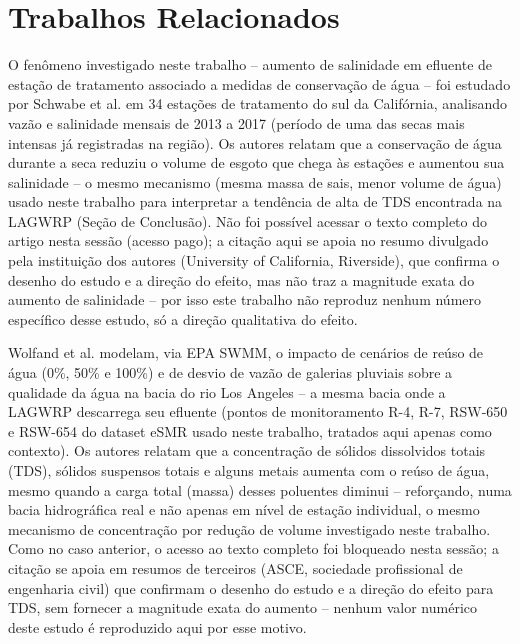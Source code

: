 \section{Trabalhos Relacionados}

O fenômeno investigado neste trabalho -- aumento de salinidade em efluente de estação de tratamento associado a medidas de conservação de água -- foi estudado por Schwabe et al. \cite{schwabe2020unintended} em 34 estações de tratamento do sul da Califórnia, analisando vazão e salinidade mensais de 2013 a 2017 (período de uma das secas mais intensas já registradas na região). Os autores relatam que a conservação de água durante a seca reduziu o volume de esgoto que chega às estações e aumentou sua salinidade -- o mesmo mecanismo (mesma massa de sais, menor volume de água) usado neste trabalho para interpretar a tendência de alta de TDS encontrada na LAGWRP (Seção de Conclusão). Não foi possível acessar o texto completo do artigo nesta sessão (acesso pago); a citação aqui se apoia no resumo divulgado pela instituição dos autores (University of California, Riverside), que confirma o desenho do estudo e a direção do efeito, mas não traz a magnitude exata do aumento de salinidade -- por isso este trabalho não reproduz nenhum número específico desse estudo, só a direção qualitativa do efeito.

Wolfand et al. \cite{wolfand2022dilution} modelam, via EPA SWMM, o impacto de cenários de reúso de água (0\%, 50\% e 100\%) e de desvio de vazão de galerias pluviais sobre a qualidade da água na bacia do rio Los Angeles -- a mesma bacia onde a LAGWRP descarrega seu efluente (pontos de monitoramento R-4, R-7, RSW-650 e RSW-654 do dataset eSMR usado neste trabalho, tratados aqui apenas como contexto). Os autores relatam que a concentração de sólidos dissolvidos totais (TDS), sólidos suspensos totais e alguns metais aumenta com o reúso de água, mesmo quando a carga total (massa) desses poluentes diminui -- reforçando, numa bacia hidrográfica real e não apenas em nível de estação individual, o mesmo mecanismo de concentração por redução de volume investigado neste trabalho. Como no caso anterior, o acesso ao texto completo foi bloqueado nesta sessão; a citação se apoia em resumos de terceiros (ASCE, sociedade profissional de engenharia civil) que confirmam o desenho do estudo e a direção do efeito para TDS, sem fornecer a magnitude exata do aumento -- nenhum valor numérico deste estudo é reproduzido aqui por esse motivo.

